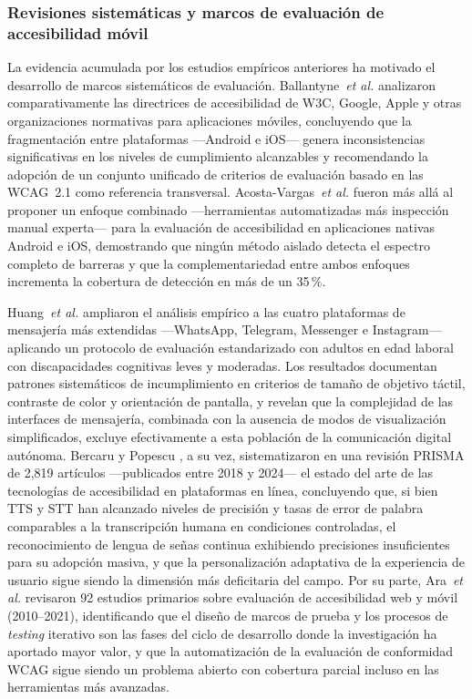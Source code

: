 \documentclass[journal]{IEEEtran}
\begin{document}
	\subsubsection{Revisiones sistem\'aticas y marcos de evaluaci\'on de accesibilidad m\'ovil}
	La evidencia acumulada por los estudios emp\'iricos anteriores ha motivado el desarrollo de marcos sistem\'aticos de evaluaci\'on. Ballantyne~\textit{et al.} \cite{ballantyne2018} analizaron comparativamente las directrices de accesibilidad de W3C, Google, Apple y otras organizaciones normativas para aplicaciones m\'oviles, concluyendo que la fragmentaci\'on entre plataformas ---Android e iOS--- genera inconsistencias significativas en los niveles de cumplimiento alcanzables y recomendando la adopci\'on de un conjunto unificado de criterios de evaluaci\'on basado en las WCAG~2.1 como referencia transversal. Acosta-Vargas~\textit{et al.} \cite{acosta2021} fueron m\'as all\'a al proponer un enfoque combinado ---herramientas automatizadas m\'as inspecci\'on manual experta--- para la evaluaci\'on de accesibilidad en aplicaciones nativas Android e iOS, demostrando que ning\'un m\'etodo aislado detecta el espectro completo de barreras y que la complementariedad entre ambos enfoques incrementa la cobertura de detecci\'on en m\'as de un 35\,\%.
	
	Huang~\textit{et al.} \cite{huang2025} ampliaron el an\'alisis emp\'irico a las cuatro plataformas de mensajer\'ia m\'as extendidas ---WhatsApp, Telegram, Messenger e Instagram--- aplicando un protocolo de evaluaci\'on estandarizado con adultos en edad laboral con discapacidades cognitivas leves y moderadas. Los resultados documentan patrones sistem\'aticos de incumplimiento en criterios de tama\~no de objetivo t\'actil, contraste de color y orientaci\'on de pantalla, y revelan que la complejidad de las interfaces de mensajer\'ia, combinada con la ausencia de modos de visualizaci\'on simplificados, excluye efectivamente a esta poblaci\'on de la comunicaci\'on digital aut\'onoma. Bercaru y Popescu \cite{bercaru2024}, a su vez, sistematizaron en una revisi\'on PRISMA de 2{,}819 art\'iculos ---publicados entre 2018 y 2024--- el estado del arte de las tecnolog\'ias de accesibilidad en plataformas en l\'inea, concluyendo que, si bien TTS y STT han alcanzado niveles de precisi\'on y tasas de error de palabra comparables a la transcripci\'on humana en condiciones controladas, el reconocimiento de lengua de se\~nas continua exhibiendo precisiones insuficientes para su adopci\'on masiva, y que la personalizaci\'on adaptativa de la experiencia de usuario sigue siendo la dimensi\'on m\'as deficitaria del campo. Por su parte, Ara~\textit{et al.} \cite{ara2024} revisaron 92 estudios primarios sobre evaluaci\'on de accesibilidad web y m\'ovil (2010--2021), identificando que el dise\~no de marcos de prueba y los procesos de \textit{testing} iterativo son las fases del ciclo de desarrollo donde la investigaci\'on ha aportado mayor valor, y que la automatizaci\'on de la evaluaci\'on de conformidad WCAG sigue siendo un problema abierto con cobertura parcial incluso en las herramientas m\'as avanzadas.
	
\end{document}
